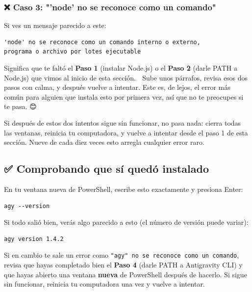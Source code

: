 \documentclass[12pt]{article}
\begin{document}
\subsubsection{❌ Caso 3: "'node' no se reconoce como un comando"}
Si ves un mensaje parecido a este:
\begin{verbatim}
'node' no se reconoce como un comando interno o externo,
programa o archivo por lotes ejecutable
\end{verbatim}
Significa que te faltó el \textbf{Paso 1} (instalar Node.js) o el \textbf{Paso 2} (darle PATH a Node.js) que vimos al inicio de esta sección. 🧱 Sube unos párrafos, revisa esos dos pasos con calma, y después vuelve a intentar. Este es, de lejos, el error más común para alguien que instala esto por primera vez, así que no te preocupes si te pasa. 😊

Si después de estos dos intentos sigue sin funcionar, no pasa nada: cierra todas las ventanas, reinicia tu computadora, y vuelve a intentar desde el paso 1 de esta sección. Nueve de cada diez veces esto arregla cualquier error raro. 🔄

\subsection{✅ Comprobando que sí quedó instalado}
En tu ventana nueva de PowerShell, escribe esto exactamente y presiona Enter:
\begin{verbatim}
agy --version
\end{verbatim}
Si todo salió bien, verás algo parecido a esto (el número de versión puede variar):
\begin{verbatim}
agy version 1.4.2
\end{verbatim}
Si en cambio te sale un error como \texttt{"agy" no se reconoce como un comando}, revisa que hayas completado bien el \textbf{Paso 4} (darle PATH a Antigravity CLI) y que hayas abierto una ventana \textbf{nueva} de PowerShell después de hacerlo. Si sigue sin funcionar, reinicia tu computadora una vez y vuelve a intentar. 🔄
\end{document}
